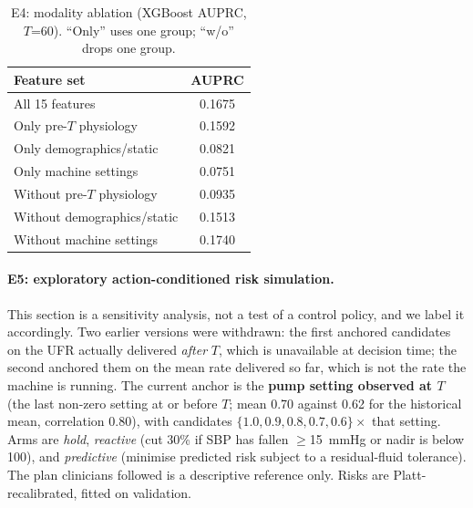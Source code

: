 \documentclass{article}
\begin{document}
\begin{table}[t]
\caption{E4: modality ablation (XGBoost AUPRC, $T$=60). ``Only'' uses one group; ``w/o'' drops one group.}
\label{tab:e4}
\centering
\begin{tabular}{lc}
\toprule
Feature set & AUPRC \\
\midrule
All 15 features & 0.1675 \\
Only pre-$T$ physiology & 0.1592 \\
Only demographics/static & 0.0821 \\
Only machine settings & 0.0751 \\
Without pre-$T$ physiology & 0.0935 \\
Without demographics/static & 0.1513 \\
Without machine settings & 0.1740 \\
\bottomrule
\end{tabular}
\end{table}

\paragraph{E5: exploratory action-conditioned risk simulation.} This section is a sensitivity analysis, not a test of a
control policy, and we label it accordingly. Two earlier versions were withdrawn: the first anchored candidates on the UFR
actually delivered \emph{after} $T$, which is unavailable at decision time; the second anchored them on the mean rate
delivered so far, which is not the rate the machine is running. The current anchor is the \textbf{pump setting observed at
$T$} (the last non-zero setting at or before $T$; mean 0.70 against 0.62 for the historical mean, correlation 0.80), with
candidates $\{1.0,0.9,0.8,0.7,0.6\}\times$ that setting. Arms are \emph{hold}, \emph{reactive} (cut 30\% if SBP has fallen
$\ge$15~mmHg or nadir is below 100), and \emph{predictive} (minimise predicted risk subject to a residual-fluid tolerance).
The plan clinicians followed is a descriptive reference only. Risks are Platt-recalibrated, fitted on validation.
\end{document}
